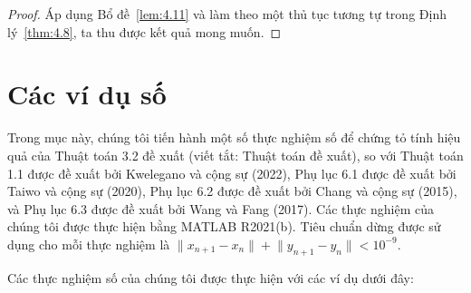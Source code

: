 \documentclass[11pt,a4paper]{article}
\theoremstyle{plain}
\theoremstyle{definition}
\theoremstyle{remark}
\numberwithin{equation}{section}
\newcommand{\nm}[1]{\lVert #1\rVert}
\begin{document}
\begin{proof}
Áp dụng Bổ đề~\ref{lem:4.11} và làm theo một thủ tục tương tự trong Định lý~\ref{thm:4.8}, ta thu được kết quả mong muốn.
\end{proof}

\section{Các ví dụ số}\label{sec:num}

Trong mục này, chúng tôi tiến hành một số thực nghiệm số để chứng tỏ tính hiệu quả của Thuật toán 3.2 đề xuất (viết tắt: Thuật toán đề xuất), so với Thuật toán 1.1 được đề xuất bởi Kwelegano và cộng sự (2022), Phụ lục 6.1 được đề xuất bởi Taiwo và cộng sự (2020), Phụ lục 6.2 được đề xuất bởi Chang và cộng sự (2015), và Phụ lục 6.3 được đề xuất bởi Wang và Fang (2017). Các thực nghiệm của chúng tôi được thực hiện bằng MATLAB R2021(b). Tiêu chuẩn dừng được sử dụng cho mỗi thực nghiệm là $\nm{x_{n+1}-x_n}+\nm{y_{n+1}-y_n}<10^{-9}$.

Các thực nghiệm số của chúng tôi được thực hiện với các ví dụ dưới đây:
\end{document}
